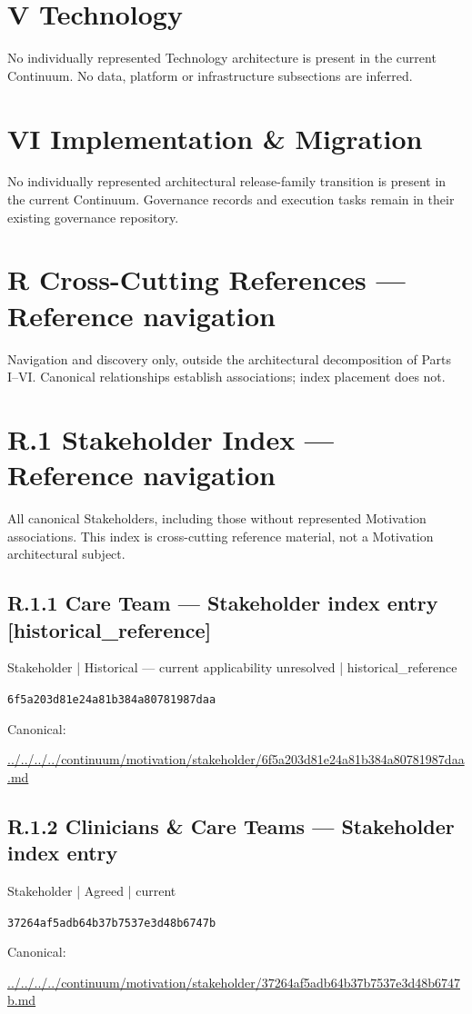\documentclass[10pt,a4paper]{article}
\begin{document}
\section*{V Technology}
No individually represented Technology architecture is present in the current Continuum. No data, platform or infrastructure subsections are inferred.\par
\section*{VI Implementation \& Migration}
No individually represented architectural release-family transition is present in the current Continuum. Governance records and execution tasks remain in their existing governance repository.\par
\section*{R Cross-Cutting References — Reference navigation}
Navigation and discovery only, outside the architectural decomposition of Parts I–VI. Canonical relationships establish associations; index placement does not.\par
\section*{R.1 Stakeholder Index — Reference navigation}
All canonical Stakeholders, including those without represented Motivation associations. This index is cross-cutting reference material, not a Motivation architectural subject.\par
\subsection*{R.1.1 Care Team — Stakeholder index entry [historical\_reference]}
\label{element-6f5a203d81e24a81b384a80781987daa}
{\small Stakeholder | Historical — current applicability unresolved | historical\_reference}\par
\texttt{6f5a203d81e24a81b384a80781987daa}\par
Canonical: \par
{\footnotesize\url{../../../../continuum/motivation/stakeholder/6f5a203d81e24a81b384a80781987daa.md}}\par
\subsection*{R.1.2 Clinicians \& Care Teams — Stakeholder index entry}
\label{element-37264af5adb64b37b7537e3d48b6747b}
{\small Stakeholder | Agreed | current}\par
\texttt{37264af5adb64b37b7537e3d48b6747b}\par
Canonical: \par
{\footnotesize\url{../../../../continuum/motivation/stakeholder/37264af5adb64b37b7537e3d48b6747b.md}}\par
\end{document}
